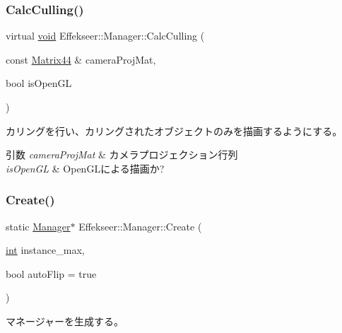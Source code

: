 \subsubsection{\texorpdfstring{Calc\+Culling()}{CalcCulling()}}
{\footnotesize\ttfamily virtual \mbox{\hyperlink{namespace_effekseer_ab34c4088e512200cf4c2716f168deb56}{void}} Effekseer\+::\+Manager\+::\+Calc\+Culling (\begin{DoxyParamCaption}\item[{const \mbox{\hyperlink{struct_effekseer_1_1_matrix44}{Matrix44}} \&}]{camera\+Proj\+Mat,  }\item[{bool}]{is\+Open\+GL }\end{DoxyParamCaption})\hspace{0.3cm}{\ttfamily [pure virtual]}}



カリングを行い、カリングされたオブジェクトのみを描画するようにする。 


\begin{DoxyParams}{引数}
{\em camera\+Proj\+Mat} & カメラプロジェクション行列 \\
\hline
{\em is\+Open\+GL} & Open\+G\+Lによる描画か? \\
\hline
\end{DoxyParams}
\mbox{\label{class_effekseer_1_1_manager_a1de74a159f3646d325f49e940e72181c}} 
\subsubsection{\texorpdfstring{Create()}{Create()}}
{\footnotesize\ttfamily static \mbox{\hyperlink{class_effekseer_1_1_manager}{Manager}}$\ast$ Effekseer\+::\+Manager\+::\+Create (\begin{DoxyParamCaption}\item[{\mbox{\hyperlink{namespace_effekseer_ace0abf7c2e6947e519ebe8b54cbcc30a}{int}}}]{instance\+\_\+max,  }\item[{bool}]{auto\+Flip = {\ttfamily true} }\end{DoxyParamCaption})\hspace{0.3cm}{\ttfamily [static]}}



マネージャーを生成する。 


